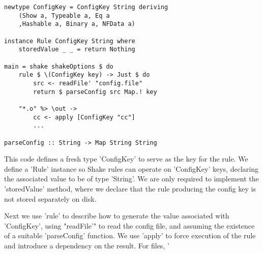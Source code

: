 \begin{lstlisting}
newtype ConfigKey = ConfigKey String deriving
    (Show a, Typeable a, Eq a
    ,Hashable a, Binary a, NFData a)

instance Rule ConfigKey String where
    storedValue _ _ = return Nothing

main = shake shakeOptions $ do
    rule $ \(ConfigKey key) -> Just $ do
        src <- readFile' "config.file"
        return $ parseConfig src Map.! key

    "*.o" %> \out ->
        cc <- apply [ConfigKey "cc"]
        ...

parseConfig :: String -> Map String String
\end{lstlisting}

This code defines a fresh type \lst'ConfigKey' to serve as the key for the rule. We define a \lst'Rule' instance so Shake rules can operate on \lst'ConfigKey' keys, declaring the associated value to be of type \lst'String'. We are only required to implement the \lst'storedValue' method, where we declare that the rule producing the config key is not stored separately on disk.

Next we use \lst'rule' to describe how to generate the value associated with \lst'ConfigKey', using \lst"readFile'" to read the config file, and assuming the existence of a suitable \lst'parseConfig' function. We use \lst'apply' to force execution of the rule and introduce a dependency on the result. For files, \lst'%

% 
% 
% 
% 

